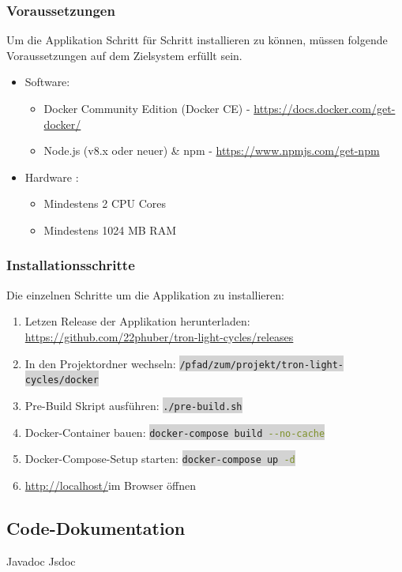 \documentclass[11pt,ngerman]{article}
\newcommand{\inlinecode}[2]{\colorbox{lightgray}{\lstinline[language=#1]$#2$}}
\begin{document}
    \subsubsection{Voraussetzungen}
    Um die Applikation Schritt für Schritt installieren zu können, müssen folgende Voraussetzungen auf dem Zielsystem erfüllt sein.
    \begin{itemize}
        \item Software:
            \begin{itemize}
                \item Docker Community Edition (Docker CE) - \url{https://docs.docker.com/get-docker/}
                \item Node.js (v8.x oder neuer) \& npm  - \url{https://www.npmjs.com/get-npm}
            \end{itemize}
        \item Hardware :
            \begin{itemize}
                \item Mindestens 2 CPU Cores
                \item Mindestens 1024 MB RAM
            \end{itemize}
    \end{itemize}

    \subsubsection{Installationsschritte}
    Die einzelnen Schritte um die Applikation zu installieren:
    \begin{enumerate}
        \item Letzen Release der Applikation herunterladen: \url{https://github.com/22phuber/tron-light-cycles/releases}
        \item In den Projektordner wechseln: \inlinecode{bash}{/pfad/zum/projekt/tron-light-cycles/docker}
        \item Pre-Build Skript ausführen: \inlinecode{bash}{./pre-build.sh}
        \item \Gls{Docker}-Container bauen: \inlinecode{bash}{docker-compose build --no-cache}
        \item \Gls{Docker-Compose}-Setup starten: \inlinecode{bash}{docker-compose up -d}
        \item \url{http://localhost/}im Browser öffnen
    \end{enumerate}


    \subsection{Code-Dokumentation}
    Javadoc
    Jsdoc
\end{document}
